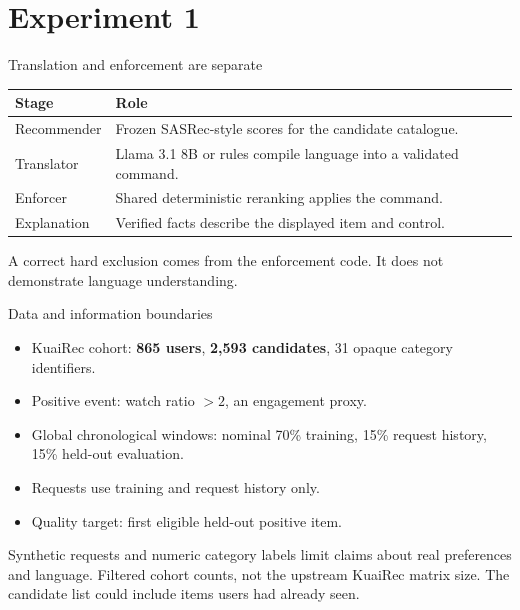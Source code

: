 \documentclass[10pt]{beamer}
\newcommand{\toprule}{\hline}
\newcommand{\midrule}{\hline}
\newcommand{\bottomrule}{\hline}
\newcommand{\src}[1]{\vfill{\tiny\color{bcitgray}#1}}
\begin{document}
\section{Experiment 1}
\begin{frame}{Translation and enforcement are separate}
\begin{tabular}{@{}P{2.2cm}P{7.9cm}@{}}
\toprule
Stage & Role\\\midrule
Recommender & Frozen SASRec-style scores for the candidate catalogue.\\[0.18cm]
Translator & Llama 3.1 8B or rules compile language into a validated command.\\[0.18cm]
Enforcer & Shared deterministic reranking applies the command.\\[0.18cm]
Explanation & Verified facts describe the displayed item and control.\\\bottomrule
\end{tabular}\par
\vspace{0.35cm}
A correct hard exclusion comes from the enforcement code. It does not demonstrate language understanding.
\end{frame}

\begin{frame}{Data and information boundaries}
\begin{itemize}
\item KuaiRec cohort: \textbf{865 users}, \textbf{2,593 candidates}, 31 opaque category identifiers.
\item Positive event: watch ratio $>2$, an engagement proxy.
\item Global chronological windows: nominal 70\% training, 15\% request history, 15\% held-out evaluation.
\item Requests use training and request history only.
\item Quality target: first eligible held-out positive item.
\end{itemize}
\vspace{0.2cm}
Synthetic requests and numeric category labels limit claims about real preferences and language.
\src{Filtered cohort counts, not the upstream KuaiRec matrix size. The candidate list could include items users had already seen.}
\end{frame}
\end{document}
